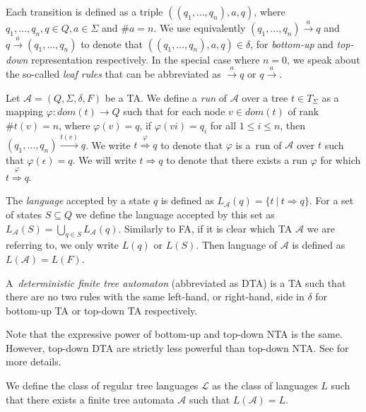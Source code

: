 Each transition is defined as a triple $((q_1,\ldots,q_n), a, q)$, where
$q_1,\ldots,q_n,q \in Q, a \in \Sigma$ and $\#a = n$. We use equivalently
$(q_1,\ldots,q_n) \overset{a}{\longrightarrow} q$ and $q
\overset{a}{\longrightarrow}  (q_1,\ldots,q_n)$ to denote that
$((q_1,\ldots,q_n), a, q) \in \delta$, for \emph{bottom-up} and \emph{top-down}
representation respectively. In the special case where $n = 0$, we speak about
the so-called \emph{leaf rules} that can be abbreviated as
$\overset{a}{\longrightarrow}  q$ or $q \overset{a}{\longrightarrow} $.

Let $\mathcal{A} = (Q, \Sigma, \delta, F)$ be a TA. We define a \emph{run} of
$\mathcal{A}$ over a tree $t \in T_\Sigma$ as a mapping $\varphi: dom(t) \to Q$
such that for each node $v \in dom(t)$ of rank $\#t(v) = n$, where $\varphi(v) =
q$, if $\varphi(vi) = q_i$ for all $1 \leq i \leq n$, then $(q_1,\ldots,q_n)
\overset{t(v)}{\longrightarrow} q$. We write $t
\overset{\varphi}{\Longrightarrow} q$ to denote that $\varphi$ is a~run of
$\mathcal{A}$ over $t$ such that $\varphi(\epsilon) = q$. We will write $t
\Longrightarrow q$ to denote that there exists a run $\varphi$ for which $t
\overset{\varphi}{\Longrightarrow} q$.

The \emph{language} accepted by a state $q$ is defined as $L_{\mathcal{A}}(q) =
\{t\ |\ t \Rightarrow q\}$. For a set of states $S \subseteq Q$ we define the
language accepted by this set as $L_{\mathcal{A}}(S) = \bigcup_{q \in S}
L_{\mathcal{A}}(q)$. Similarly to FA, if it is clear which TA $\mathcal{A}$ we
are referring to, we only write $L(q)$ or $L(S)$. Then language of $\mathcal{A}$
is defined as $L(\mathcal{A}) = L(F)$.

\begin{defz}
A~\emph{deterministic finite tree automaton} (abbreviated as DTA) is a
TA such that there are no two rules with the
same left-hand, or right-hand, side in $\delta$ for bottom-up TA or top-down
TA respectively.
\end{defz}

Note that the expressive power of bottom-up and top-down NTA is the same.
However, top-down DTA are strictly less powerful than top-down NTA. See
\cite{tata} for more details.

\begin{defz}
We define the class of regular tree languages $\mathcal{L}$ as the class of
languages $L$ such that there exists a finite tree automata $\mathcal{A}$ such that
$L(\mathcal{A}) = L$.
\end{defz}

